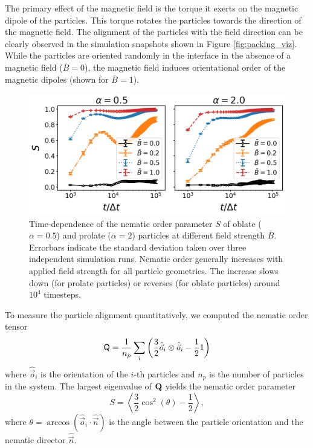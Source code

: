 The primary effect of the magnetic field is the torque it exerts on the
magnetic dipole of the particles. This torque rotates the particles
towards the direction of the magnetic field. The alignment of the
particles with the field direction can be clearly observed in the
simulation snapshots shown in Figure \ref{fig:packing_viz}. While the
particles are oriented randomly in the interface in the absence of a
magnetic field (\(\bar{B}=0\)), the magnetic field induces orientational
order of the magnetic dipoles (shown for \(\bar{B}=1\)).

\begin{figure}
\centering
\includegraphics[width=\columnwidth]{figures/results/paper1/S-vs-t.png}
\caption{Time-dependence of the nematic order parameter $S$ of oblate ($\alpha=0.5$) and prolate ($\alpha=2$) particles at different field strength $\bar{B}$. Errorbars indicate the standard deviation taken over three independent simulation runs. Nematic order generally increases with applied field strength for all particle geometries. The increase slows down (for prolate particles) or reverses (for oblate particles) around $10^4$ timesteps.}
\label{fig:nematic_time}
\end{figure}

To measure the particle alignment quantitatively, we computed the
nematic order tensor \cite{veerman_phase_1992}
%
\begin{equation}
\tens{Q} = \frac{1}{n_p} \sum_i \left( \frac{3}{2} \hat{\vec{o}}_i \otimes \hat{\vec{o}}_i -\frac{1}{2}\mathsf{1} \right)
\end{equation}
%
where \(\hat{\vec{o}}_i\) is the orientation of the
\(i\)-th particles and \(n_p\) is the number of particles in the system.
The largest eigenvalue of $\tens{Q}$ yields the nematic order
parameter
%
\begin{equation}
S = \left\langle \frac{3}{2}\cos^2 (\theta) - \frac{1}{2} \right\rangle ,
\end{equation}
%
where
\(\theta=\arccos(\hat{\vec{o}}_i\cdot\hat{\vec{n}})\) is the angle
between the particle orientation and the nematic director
\(\hat{\vec{n}}\).

